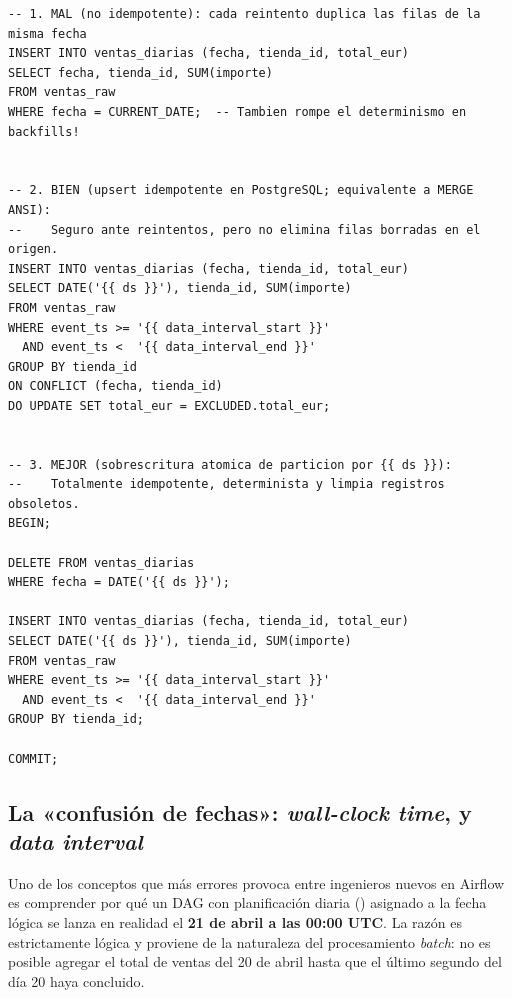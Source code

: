 \begin{lstlisting}[style=sql, caption={Comparativa de tres patrones SQL frente a la idempotencia ante reintentos y reprocesamientos.}, label={lst:sql-idempotencia}]
-- 1. MAL (no idempotente): cada reintento duplica las filas de la misma fecha
INSERT INTO ventas_diarias (fecha, tienda_id, total_eur)
SELECT fecha, tienda_id, SUM(importe)
FROM ventas_raw
WHERE fecha = CURRENT_DATE;  -- Tambien rompe el determinismo en backfills!


-- 2. BIEN (upsert idempotente en PostgreSQL; equivalente a MERGE ANSI):
--    Seguro ante reintentos, pero no elimina filas borradas en el origen.
INSERT INTO ventas_diarias (fecha, tienda_id, total_eur)
SELECT DATE('{{ ds }}'), tienda_id, SUM(importe)
FROM ventas_raw
WHERE event_ts >= '{{ data_interval_start }}'
  AND event_ts <  '{{ data_interval_end }}'
GROUP BY tienda_id
ON CONFLICT (fecha, tienda_id)
DO UPDATE SET total_eur = EXCLUDED.total_eur;


-- 3. MEJOR (sobrescritura atomica de particion por {{ ds }}):
--    Totalmente idempotente, determinista y limpia registros obsoletos.
BEGIN;

DELETE FROM ventas_diarias
WHERE fecha = DATE('{{ ds }}');

INSERT INTO ventas_diarias (fecha, tienda_id, total_eur)
SELECT DATE('{{ ds }}'), tienda_id, SUM(importe)
FROM ventas_raw
WHERE event_ts >= '{{ data_interval_start }}'
  AND event_ts <  '{{ data_interval_end }}'
GROUP BY tienda_id;

COMMIT;
\end{lstlisting}

\subsection{La «confusión de fechas»: \textit{wall-clock time}, \texorpdfstring{}{logical\_date} y \textit{data interval}}

Uno de los conceptos que más errores provoca entre ingenieros nuevos en Airflow es comprender por qué un DAG con planificación diaria () asignado a la fecha lógica  se lanza en realidad el \textbf{21 de abril a las 00:00 UTC}. La razón es estrictamente lógica y proviene de la naturaleza del procesamiento \textit{batch}: no es posible agregar el total de ventas del 20 de abril hasta que el último segundo del día 20 haya concluido.

